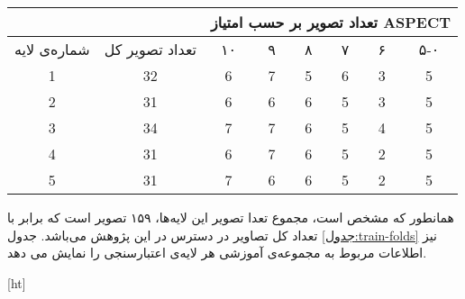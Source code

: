 \begin{tabular}{cccccccc}
    \cline{3-8}
                                                               &                                        & \multicolumn{6}{c}{تعداد تصویر بر حسب امتیاز ASPECT}                                                                                                                                                                             \\ \hline
     
    {شماره‌ی لایه} & تعداد تصویر کل & {۱۰} & {۹} & {۸} & {۷} & {۶} & ۵-۰ \\ \hline
    {1}                                    & 32                                     & {6}                          & {7}                         & {5}                         & {6}                         & {3}                         & 5   \\ 
    {2}                                    & 31                                     & {6}                          & {6}                         & {6}                         & {5}                         & {3}                         & 5   \\ 
    {3}                                    & 34                                     & {7}                          & {7}                         & {6}                         & {5}                         & {4}                         & 5   \\ 
    {4}                                    & 31                                     & {6}                          & {7}                         & {6}                         & {5}                         & {2}                         & 5   \\ 
    {5}                                    & 31                                     & {7}                          & {6}                         & {6}                         & {5}                         & {2}                         & 5   \\ \hline
    \end{tabular}


همانطور که مشخص است، مجموع تعدا تصویر این لایه‌ها، ۱۵۹ تصویر است که برابر با تعداد کل تصاویر در دسترس در این پژوهش می‌باشد.
جدول \ref{جدول:train-folds} نیز
اطلاعات مربوط به مجموعه‌ی آموزشی هر لایه‌ی اعتبارسنجی را نمایش می دهد.

[ht]

\vspace{1.5em}

